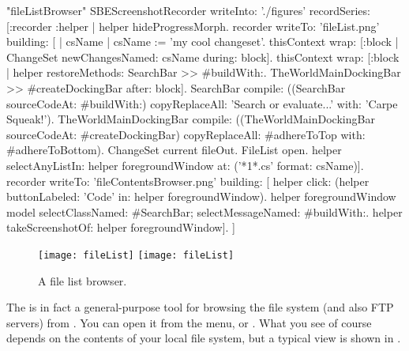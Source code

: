 \documentclass[a4paper,10pt,twoside]{book}
\begin{document}
\begin{ExecuteSmalltalkScript}"fileListBrowser"
SBEScreenshotRecorder writeInto: './figures' recordSeries: [:recorder :helper |
	helper hideProgressMorph.
	recorder writeTo: 'fileList.png' building: [
		| csName |
		csName := 'my cool changeset'.
		thisContext wrap: [:block | ChangeSet newChangesNamed: csName during: block].
		thisContext wrap: [:block | helper restoreMethods: {SearchBar >> #buildWith:. TheWorldMainDockingBar >> #createDockingBar} after: block].
		SearchBar compile: ((SearchBar sourceCodeAt: #buildWith:)
			copyReplaceAll: 'Search or evaluate...' with: 'Carpe Squeak!').
		TheWorldMainDockingBar compile: ((TheWorldMainDockingBar sourceCodeAt: #createDockingBar)
			copyReplaceAll: #adhereToTop with: #adhereToBottom).
		ChangeSet current fileOut.
		FileList open.
		helper selectAnyListIn: helper foregroundWindow at: ('*{1}*.cs' format: {csName})].
	recorder writeTo: 'fileContentsBrowser.png' building: [
		helper click: (helper buttonLabeled: 'Code' in: helper foregroundWindow).
		helper foregroundWindow model
			selectClassNamed: #SearchBar;
			selectMessageNamed: #buildWith:.
		helper takeScreenshotOf: helper foregroundWindow].
]
\end{ExecuteSmalltalkScript}
\begin{figure}[btp]
	\begin{center}
	\ifluluelse
		{\texttt{[image: fileList]}}
		{\texttt{[image: fileList]}}
	\end{center}
	\caption{A file list browser.}
	\label{fig:fileList}
\end{figure}

The  is in fact a general-purpose tool for browsing the file system (and also FTP servers) from \sq.
You can open it from the  menu, or .
What you see of course depends on the contents of your local file system, but a typical view is shown in .
\end{document}
